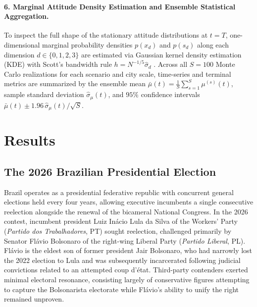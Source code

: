 \documentclass{article}
\begin{document}
\paragraph{6. Marginal Attitude Density Estimation and Ensemble Statistical Aggregation.}
To inspect the full shape of the stationary attitude distributions at $t = T$, one-dimensional marginal probability densities $p(x_d)$ and $p(s_d)$ along each dimension $d \in \{0, 1, 2, 3\}$ are estimated via Gaussian kernel density estimation (KDE) with Scott's bandwidth rule $h = N^{-1/5}\hat{\sigma}_d$ \citep{scott2015multivariate}. Across all $S = 100$ Monte Carlo realizations for each scenario and city scale, time-series and terminal metrics are summarized by the ensemble mean $\bar{\mu}(t) = \frac{1}{S}\sum_{s=1}^S \mu^{(s)}(t)$, sample standard deviation $\hat{\sigma}_{\mu}(t)$, and $95\%$ confidence intervals $\bar{\mu}(t) \pm 1.96\,\hat{\sigma}_{\mu}(t)/\sqrt{S}$.





\section{Results}
\label{sec:results}


\subsection{The 2026 Brazilian Presidential Election}

Brazil operates as a presidential federative republic with concurrent general elections held every four years, allowing executive incumbents a single consecutive reelection alongside the renewal of the bicameral National Congress. In the 2026 contest, incumbent president Luiz In\'acio Lula da Silva of the Workers' Party (\emph{Partido dos Trabalhadores}, PT) sought reelection, challenged primarily by Senator Fl\'avio Bolsonaro of the right-wing Liberal Party (\emph{Partido Liberal}, PL). Fl\'avio is the eldest son of former president Jair Bolsonaro, who had narrowly lost the 2022 election to Lula and was subsequently incarcerated following judicial convictions related to an attempted coup d'\'etat. Third-party contenders exerted minimal electoral resonance, consisting largely of conservative figures attempting to capture the Bolsonarista electorate while Fl\'avio's ability to unify the right remained unproven.
\end{document}
